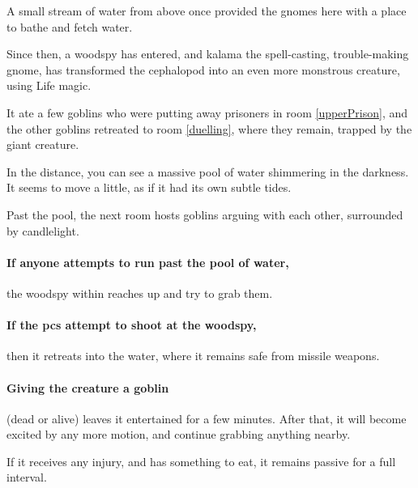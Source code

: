 \begin{multicols}{2}

\begin{exampletext}

  A small stream of water from above once provided the gnomes here with a place to bathe and fetch water.

  Since then, a woodspy has entered, and \gls{kalama} the spell-casting, trouble-making gnome, has transformed the cephalopod into an even more monstrous creature, using Life magic.

  It ate a few goblins who were putting away prisoners in room \vref{upperPrison}, and the other goblins retreated to room \vref{duelling}, where they remain, trapped by the giant creature.

\end{exampletext}

\begin{boxtext}
  In the distance, you can see a massive pool of water shimmering in the darkness.
  It seems to move a little, as if it had its own subtle tides.

  Past the pool, the next room hosts goblins arguing with each other, surrounded by candlelight.
\end{boxtext}


\paragraph{If anyone attempts to run past the pool of water,}
the woodspy within reaches up and try to grab them.

\paragraph{If the \glspl{pc} attempt to shoot at the woodspy,}
then it retreats into the water, where it remains safe from missile weapons.

\paragraph{Giving the creature a goblin}
(dead or alive)
leaves it entertained for a few minutes.
After that, it will become excited by any more motion, and continue grabbing anything nearby.

If it receives any injury, and has something to eat, it remains passive for a full \gls{interval}.



\end{multicols}
